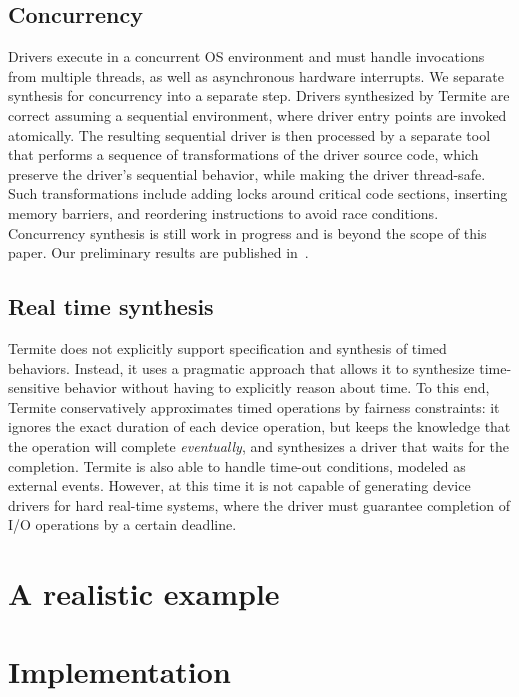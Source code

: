 \documentclass{book}
\newcommand{\termite}{Termite\xspace}
\theoremstyle{definition}
\begin{document}
\subsection{Concurrency}

Drivers execute in a concurrent OS environment and must handle invocations from multiple threads, as well as asynchronous hardware interrupts.  We separate synthesis for concurrency into a separate step.  Drivers synthesized by \termite are correct assuming a sequential environment, where driver entry points are invoked atomically.  The resulting sequential driver is then processed by a separate tool that performs a sequence of transformations of the driver source code, which preserve the driver's sequential behavior, while making the driver thread-safe.  Such transformations include adding locks around critical code sections, inserting memory barriers, and reordering instructions to avoid race conditions.  Concurrency synthesis is still work in progress and is beyond the scope of this paper.  Our preliminary results are published in~\cite{Cerny_HRRT_13, Cerny_HRRT_14}.

\subsection{Real time synthesis}

\termite does not explicitly support specification and synthesis of timed behaviors.  Instead, it uses a pragmatic approach that allows it to synthesize time-sensitive behavior without having to explicitly reason about time.  To this end, \termite conservatively approximates timed operations by fairness constraints: it ignores the exact duration of each device operation, but keeps the knowledge that the operation will complete \emph{eventually}, and synthesizes a driver that waits for the completion.  \termite is also able to handle time-out conditions, modeled as external events.  However, at this time it is not capable of generating device drivers for hard real-time systems, where the driver must guarantee completion of I/O operations by a certain deadline.

\section{A realistic example}

\section{Implementation}
\end{document}

